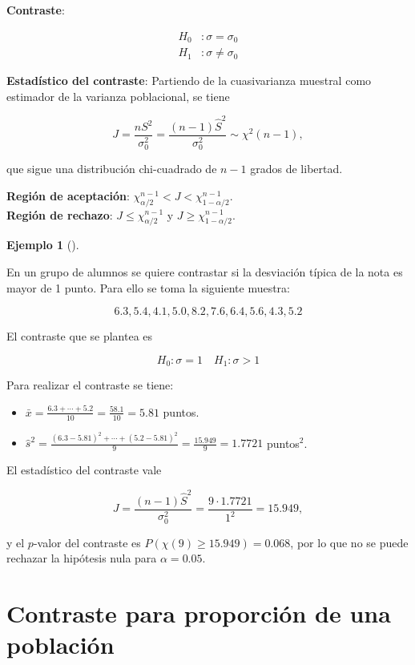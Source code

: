 \documentclass[
  a4paper,
]{scrreport}
\providecommand{\tightlist}{%
  \setlength{\itemsep}{0pt}\setlength{\parskip}{0pt}}\usepackage{longtable,booktabs,array}
\theoremstyle{plain}
\theoremstyle{definition}
\theoremstyle{definition}
\newtheorem{example}{Ejemplo}[chapter]
\theoremstyle{remark}
\begin{document}
\textbf{Contraste}:

\begin{align*}
H_0 &: \sigma=\sigma_0 \\
H_1 &: \sigma\neq \sigma_0
\end{align*}

\textbf{Estadístico del contraste}: Partiendo de la cuasivarianza
muestral como estimador de la varianza poblacional, se tiene

\[
J=\frac{nS^2}{\sigma_0^2} = \frac{(n-1)\hat{S}^2}{\sigma_0^2}\sim \chi^2(n-1),
\]

que sigue una distribución chi-cuadrado de \(n-1\) grados de libertad.

\textbf{Región de aceptación}:
\(\chi_{\alpha/2}^{n-1} < J < \chi_{1-\alpha/2}^{n-1}\).\\
\textbf{Región de rechazo}: \(J\leq \chi_{\alpha/2}^{n-1}\) y
\(J\geq \chi_{1-\alpha/2}^{n-1}\).

\begin{example}[]\protect\hypertarget{exm-contraste-varianza}{}\label{exm-contraste-varianza}

En un grupo de alumnos se quiere contrastar si la desviación típica de
la nota es mayor de 1 punto. Para ello se toma la siguiente muestra:

\[
6.3, 5.4, 4.1, 5.0, 8.2, 7.6, 6.4, 5.6, 4.3, 5.2
\]

El contraste que se plantea es

\[
H_0: \sigma=1 \quad H_1: \sigma>1
\]

Para realizar el contraste se tiene:

\begin{itemize}
\tightlist
\item
  \(\bar x = \frac{6.3+\cdots+5.2}{10}=\frac{58.1}{10}=5.81\) puntos.
\item
  \(\hat s^2 = \frac{(6.3-5.81)^2+\cdots+(5.2-5.81)^2}{9} = \frac{15.949}{9}=1.7721\)
  puntos\(^2\).
\end{itemize}

El estadístico del contraste vale

\[
J= \frac{(n-1)\hat{S}^2}{\sigma_0^2} = \frac{9\cdot1.7721}{1^2} = 15.949,
\]

y el \(p\)-valor del contraste es \(P(\chi(9)\geq 15.949) = 0.068\), por
lo que no se puede rechazar la hipótesis nula para \(\alpha=0.05\).

\end{example}

\section{Contraste para proporción de una
población}\label{contraste-para-proporciuxf3n-de-una-poblaciuxf3n}
\end{document}
